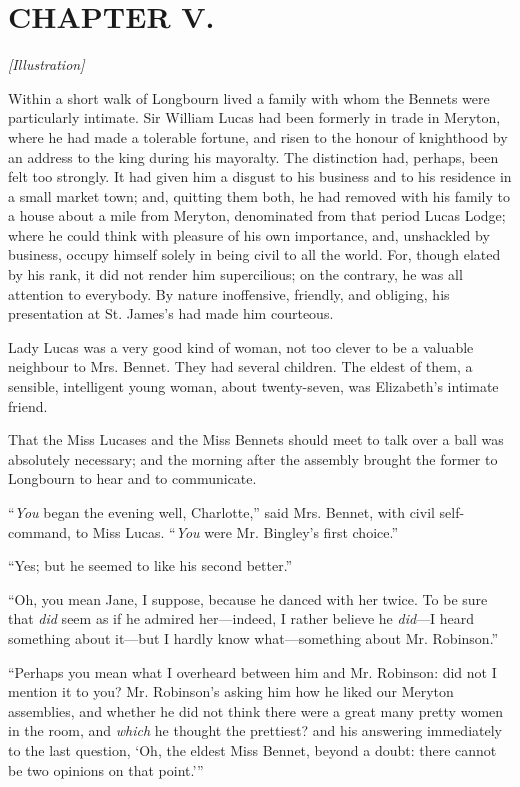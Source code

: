 \documentclass[12pt]{book}
\begin{document}
\chapter{CHAPTER V.}

\emph{[Illustration]}

Within a short walk of Longbourn lived a family with whom the Bennets were particularly intimate. Sir William Lucas had been formerly in trade in Meryton, where he had made a tolerable fortune, and risen to the honour of knighthood by an address to the king during his mayoralty. The distinction had, perhaps, been felt too strongly. It had given him a disgust to his business and to his residence in a small market town; and, quitting them both, he had removed with his family to a house about a mile from Meryton, denominated from that period Lucas Lodge; where he could think with pleasure of his own importance, and, unshackled by business, occupy himself solely in being civil to all the world. For, though elated by his rank, it did not render him supercilious; on the contrary, he was all attention to everybody. By nature inoffensive, friendly, and obliging, his presentation at St. James's had made him courteous.

Lady Lucas was a very good kind of woman, not too clever to be a valuable neighbour to Mrs. Bennet. They had several children. The eldest of them, a sensible, intelligent young woman, about twenty-seven, was Elizabeth's intimate friend.

That the Miss Lucases and the Miss Bennets should meet to talk over a ball was absolutely necessary; and the morning after the assembly brought the former to Longbourn to hear and to communicate.

``\textit{You} began the evening well, Charlotte,'' said Mrs. Bennet, with civil self-command, to Miss Lucas. ``\textit{You} were Mr. Bingley's first choice.''

``Yes; but he seemed to like his second better.''

``Oh, you mean Jane, I suppose, because he danced with her twice. To be sure that \textit{did} seem as if he admired her---indeed, I rather believe he \textit{did}---I heard something about it---but I hardly know what---something about Mr. Robinson.''

``Perhaps you mean what I overheard between him and Mr. Robinson: did not I mention it to you? Mr. Robinson's asking him how he liked our Meryton assemblies, and whether he did not think there were a great many pretty women in the room, and \textit{which} he thought the prettiest? and his answering immediately to the last question, `Oh, the eldest Miss Bennet, beyond a doubt: there cannot be two opinions on that point.'''
\end{document}
